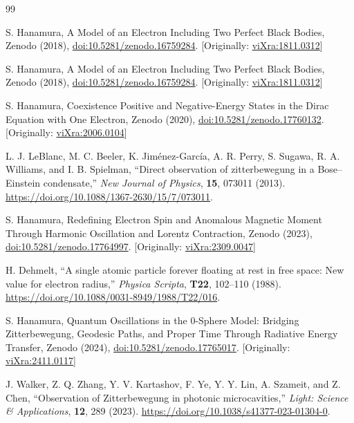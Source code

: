 \documentclass[%
 reprint,
 amsmath,amssymb,
 aps,
]{revtex4-1}
\numberwithin{equation}{section}%
\begin{document}
\begin{thebibliography}{99}

S. Hanamura, A Model of an Electron Including Two Perfect Black Bodies, Zenodo (2018), \href{https://doi.org/10.5281/zenodo.16759284}{doi:10.5281/zenodo.16759284}. [Originally: \href{https://vixra.org/abs/1811.0312}{viXra:1811.0312}]

S. Hanamura, A Model of an Electron Including Two Perfect Black Bodies, Zenodo (2018), \href{https://doi.org/10.5281/zenodo.16759284}{doi:10.5281/zenodo.16759284}. [Originally: \href{https://vixra.org/abs/1811.0312}{viXra:1811.0312}]

S. Hanamura, Coexistence Positive and Negative-Energy States in the Dirac Equation with One Electron, Zenodo (2020), \href{https://doi.org/10.5281/zenodo.17760132}{doi:10.5281/zenodo.17760132}. [Originally: \href{https://vixra.org/abs/2006.0104}{viXra:2006.0104}]

L. J. LeBlanc, M. C. Beeler, K. Jiménez-García, A. R. Perry, S. Sugawa, R. A. Williams, and I. B. Spielman, ``Direct observation of zitterbewegung in a Bose–Einstein condensate,'' \textit{New Journal of Physics}, \textbf{15}, 073011 (2013). \href{https://doi.org/10.1088/1367-2630/15/7/073011}{https://doi.org/10.1088/1367-2630/15/7/073011}.

S. Hanamura, Redefining Electron Spin and Anomalous Magnetic Moment Through Harmonic Oscillation and Lorentz Contraction, Zenodo (2023), \href{https://doi.org/10.5281/zenodo.17764997}{doi:10.5281/zenodo.17764997}. [Originally: \href{https://vixra.org/abs/2309.0047}{viXra:2309.0047}]

H. Dehmelt, ``A single atomic particle forever floating at rest in free space: New value for electron radius,'' \textit{Physica Scripta}, \textbf{T22}, 102--110 (1988). \href{https://doi.org/10.1088/0031-8949/1988/T22/016}{https://doi.org/10.1088/0031-8949/1988/T22/016}.

S. Hanamura, Quantum Oscillations in the 0-Sphere Model: Bridging Zitterbewegung, Geodesic Paths, and Proper Time Through Radiative Energy Transfer, Zenodo (2024), \href{https://doi.org/10.5281/zenodo.17765017}{doi:10.5281/zenodo.17765017}. [Originally: \href{https://vixra.org/abs/2411.0117}{viXra:2411.0117}]

J. Walker, Z. Q. Zhang, Y. V. Kartashov, F. Ye, Y. Y. Lin, A. Szameit, and Z. Chen, ``Observation of Zitterbewegung in photonic microcavities,'' \textit{Light: Science \& Applications}, \textbf{12}, 289 (2023). \href{https://doi.org/10.1038/s41377-023-01304-0}{https://doi.org/10.1038/s41377-023-01304-0}.


\end{thebibliography}
\end{document}
